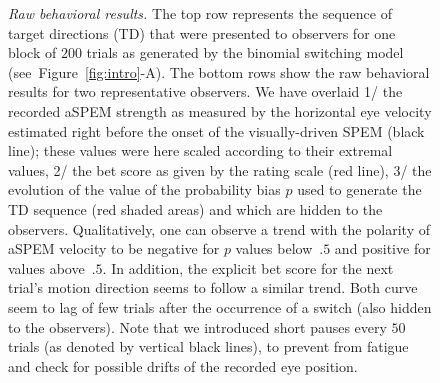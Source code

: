 \documentclass[12pt,english]{article}%
\newcommand{\seeFig}[1]{Figure~\ref{fig:#1}}
\begin{document}
\begin{figure}%
\caption{
\emph{Raw behavioral results.} %
The top row represents the sequence of target directions (TD)
that were presented to observers
for one block of $200$ trials
as generated by the binomial switching model (see~\seeFig{intro}-A).
The bottom rows show the raw behavioral results 
for two representative observers.
We have overlaid 
1/ the recorded aSPEM strength as measured by the horizontal eye velocity estimated right before
the onset of the visually-driven SPEM (black line);
these values were here scaled according to their extremal values,
2/ the bet score as given by the rating scale (red line),
3/ the evolution of the value 
of the probability bias $p$ used to generate the TD sequence (red shaded areas)
and which are hidden to the observers.
Qualitatively, one can observe a trend with the polarity of aSPEM velocity
to be negative for $p$ values below~$.5$ and positive for values above~$.5$.
In addition, the explicit bet score
for the next trial's motion direction
seems to follow a similar trend.
Both curve seem to lag of few trials 
after the occurrence of a switch
(also hidden to the observers).
Note that we introduced short pauses every $50$ trials (as denoted by vertical black lines), to prevent from fatigue and check for possible drifts of the recorded eye position.
}
\label{fig:results_raw}
\end{figure}
\end{document}
